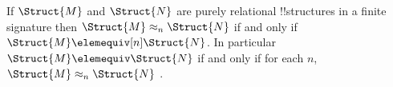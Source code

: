 \documentclass[../../include/open-logic-section]{subfiles}
\begin{document}
\begin{cor}
  If $\Struct{M}$ and $\Struct{N}$ are purely relational !!{structure}s
  in a finite signature then $\Struct{M} \approx_n\Struct{N}$ if and
  only if $\Struct{M} \elemequiv[n] \Struct{N}$. In particular
  $\Struct{M} \elemequiv \Struct{N}$ if and only if for each $n$,
  $\Struct{M} \approx_n \Struct{N}$ .
\end{cor}
\end{document}
